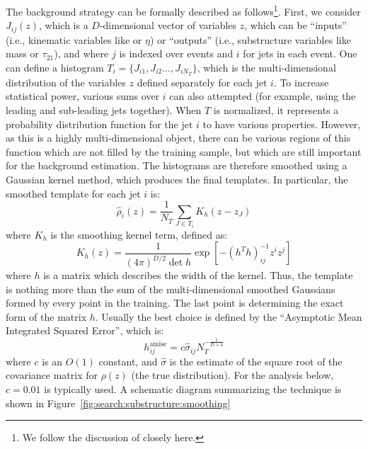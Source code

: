 The background strategy can be formally described as follows\footnote{We follow the discussion of \cite{MassTemplates} closely here.}. First, we consider $J_{ij}(z)$, which is a $D$-dimensional vector of variables $z$, which can be ``inputs'' (i.e., kinematic variables like \pt or $\eta$) or ``outputs'' (i.e., substructure variables like mass or $\tau_{21}$), and where $j$ is indexed over events and $i$ for jets in each event. One can define a histogram $T_i = \{J_{i1}, J_{i2}..., J_{iN_T}\}$, which is the multi-dimensional distribution of the variables $z$ defined separately for each jet $i$. To increase statistical power, various sums over $i$ can also attempted (for example, using the leading and sub-leading jets together). When $T$ is normalized, it represents a probability distribution function for the jet $i$ to have various properties. However, as this is a highly multi-dimensional object, there can be various regions of this function which are not filled by the training sample, but which are still important for the background estimation. The histograms are therefore smoothed using a Gaussian kernel method, which produces the final templates. In particular, the smoothed template for each jet $i$ is:
%
\begin{equation}
\hat{\rho}_i(z) = \frac{1}{N_T} \sum_{J\in T_i} K_h(z - z_J)
\end{equation}
%
where $K_h$ is the smoothing kernel term, defined as:
%
\begin{equation}
K_h(z) = \frac{1}{(4\pi)^{D/2} \det h} \exp \left[ - \left(h^T h \right)^{-1}_{ij} z^i z^j \right]
\end{equation}
% 
where $h$ is a matrix which describes the width of the kernel. Thus, the template is nothing more than the sum of the multi-dimensional smoothed Gaussians formed by every point in the training. The last point is determining the exact form of the matrix $h$. Usually the best choice is defined by the ``Asymptotic Mean Integrated Squared Error'', which is:
%
\begin{equation}
h_{ij}^\mathrm{amise} = c \hat{\sigma}_{ij} N_T^{-\frac{1}{D+4}}
\end{equation}
%
where $c$ is an $O(1)$ constant, and $\hat{\sigma}$ is the estimate of the square root of the covariance matrix for $\rho(z)$ (the true distribution). For the analysis below, $c=0.01$ is typically used. A schematic diagram summarizing the technique is shown in Figure~\ref{fig:search:substructure:smoothing}


